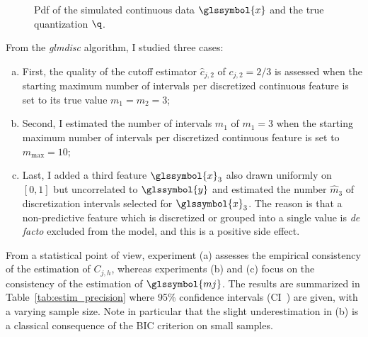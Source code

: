 \begin{figure}[!ht]
\centering
{}
\caption{\label{fig:exp_sim} Pdf of the simulated continuous data $\glssymbol{x}$ and the true quantization $\q$.}
\end{figure}


From the \textit{glmdisc} algorithm, I studied three cases:
\begin{enumerate}[(a)]
    \item First, the quality of the cutoff estimator $\hat{c}_{j,2}$ of $c_{j,2} = 2/3$ is assessed when the starting maximum number of intervals per discretized continuous feature is set to its true value $m_1=m_2= 3$;
    \item Second, I estimated the number of intervals $\hat{m}_1$ of $m_1=3$ when the starting maximum number of intervals per discretized continuous feature is set to $m_{\text{max}} = 10$; 
    \item Last, I added a third feature $\glssymbol{x}_3$ also drawn uniformly on $[0,1]$ but uncorrelated to $\glssymbol{y}$ and estimated the number $\hat{m}_3$ of discretization intervals selected for $\glssymbol{x}_3$. The reason is that a non-predictive feature which is discretized or grouped into a single value is \textit{de facto} excluded from the model, and this is a positive side effect.
\end{enumerate}
From a statistical point of view, experiment (a) assesses the empirical consistency of the estimation of $C_{j,h}$, whereas experiments (b) and (c) focus on the consistency of the estimation of $\glssymbol{mj}$. The results are summarized in Table~\ref{tab:estim_precision} where 95\% confidence intervals (CI~\cite{sun2014fast}) are given, with a varying sample size. Note in particular that the slight underestimation in (b) is a classical consequence of the BIC criterion on small samples. 


